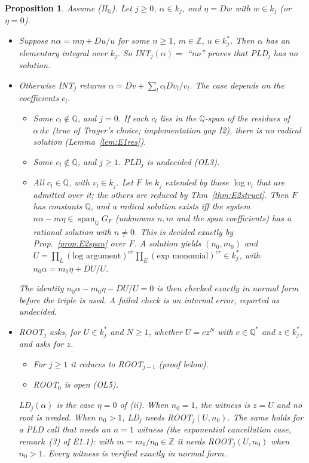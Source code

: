 \documentclass[11pt]{article}
\newtheorem{proposition}[theorem]{Proposition}
\theoremstyle{definition}
\theoremstyle{remark}
\newcommand{\Q}{\mathbb{Q}}
\newcommand{\Z}{\mathbb{Z}}
\begin{document}
\begin{proposition}\label{prop:E1ld}
Assume (H$_\Q$). Let $j\ge0$, $\alpha\in k_j$, and $\eta=Dw$ with $w\in k_j$ (or $\eta=0$).
\begin{itemize}
\item[(i)] Suppose $n\alpha=m\eta+Du/u$ for some $n\ge1$, $m\in\Z$, $u\in k_j^*$. Then $\alpha$
  has an elementary integral over $k_j$. So INT$_j(\alpha)=$ ``no'' proves that PLD$_j$ has no
  solution.
\item[(ii)] Otherwise INT$_j$ returns $\alpha=Dv+\sum_lc_lDv_l/v_l$. The case depends on the
  coefficients $c_l$.
  \begin{itemize}
  \item Some $c_l\notin\Q$, and $j=0$. If each $c_l$ lies in the $\Q$-span of the residues of
    $\alpha\,dx$ (true of Trager's choice; implementation gap I2), there is no radical solution
    (Lemma~\ref{lem:E1res}).
  \item Some $c_l\notin\Q$, and $j\ge1$. PLD$_j$ is undecided (OL3).
  \item All $c_l\in\Q$, with $v_l\in k_j$. Let $F$ be $k_j$ extended by those $\log v_l$ that
    are admitted over it; the others are reduced by Thm~\ref{thm:E2struct}. Then $F$ has
    constants $\Q$, and a radical solution exists iff the system
    $n\alpha-m\eta\in\operatorname{span}_\Q G_F$ (unknowns $n,m$ and the span coefficients) has
    a rational solution with $n\ne0$. This is decided exactly by Prop.~\ref{prop:E2span} over
    $F$. A solution yields $(n_0,m_0)$ and
    $U=\prod_L(\text{log argument})^{e r}\prod_E(\text{exp monomial})^{e r}\in k_j^*$, with
    $n_0\alpha=m_0\eta+DU/U$.
  \end{itemize}
  The identity $n_0\alpha-m_0\eta-DU/U=0$ is then checked exactly in normal form before the
  triple is used. A failed check is an internal error, reported as undecided.
\item[(iii)] ROOT$_j$ asks, for $U\in k_j^*$ and $N\ge1$, whether $U=cz^N$ with $c\in\Q^*$ and
  $z\in k_j^*$, and asks for $z$.
  \begin{itemize}
  \item For $j\ge1$ it reduces to ROOT$_{j-1}$ (proof below).
  \item ROOT$_0$ is open (OL5).
  \end{itemize}
  LD$_j(\alpha)$ is the case $\eta=0$ of (ii). When $n_0=1$, the witness is $z=U$ and no root is
  needed. When $n_0>1$, LD$_j$ needs ROOT$_j(U,n_0)$. The same holds for a PLD call that needs an
  $n=1$ witness (the exponential cancellation case, remark~(3) of E1.1): with $m=m_0/n_0\in\Z$
  it needs ROOT$_j(U,n_0)$ when $n_0>1$. Every witness is verified exactly in normal form.
\end{itemize}
\end{proposition}
\end{document}
